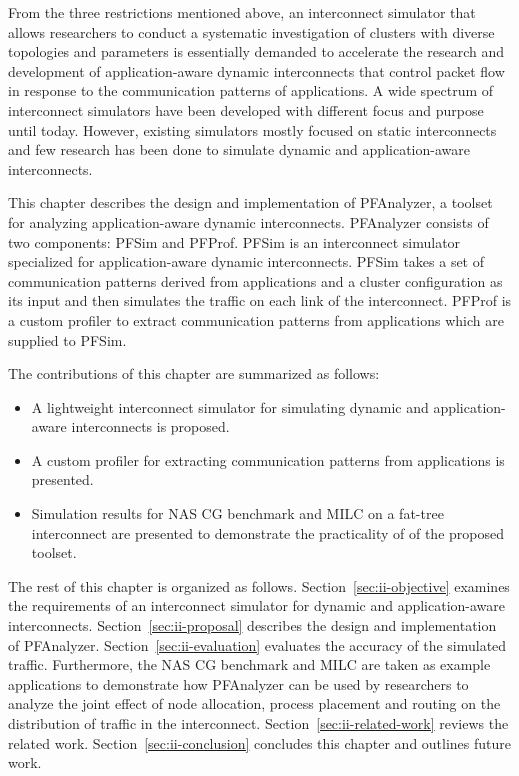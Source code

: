 From the three restrictions mentioned above, an interconnect simulator that
allows researchers to conduct a systematic investigation of clusters with
diverse topologies and parameters is essentially demanded to accelerate the
research and development of application-aware dynamic interconnects that
control packet flow in response to the communication patterns of applications.
A wide spectrum of interconnect simulators have been developed with different
focus and purpose until today. However, existing simulators mostly focused on
static interconnects and few research has been done to simulate dynamic and
application-aware interconnects.

This chapter describes the design and implementation of PFAnalyzer, a
toolset for analyzing application-aware dynamic interconnects.
PFAnalyzer consists of two components: PFSim and PFProf. PFSim is an
interconnect simulator specialized for application-aware dynamic
interconnects. PFSim takes a set of communication patterns derived from
applications and a cluster configuration as its input and then simulates the
traffic on each link of the interconnect. PFProf is a custom profiler to
extract communication patterns from applications which are supplied to PFSim.

The contributions of this chapter are summarized as follows:

\begin{itemize}
\item
  A lightweight interconnect simulator for simulating dynamic and
  application-aware interconnects is proposed.
\item
  A custom profiler for extracting communication patterns from
  applications is presented.
\item
  Simulation results for NAS CG benchmark and MILC on a fat-tree
  interconnect are presented to demonstrate the practicality of of the
  proposed toolset.
\end{itemize}

The rest of this chapter is organized as follows.
Section~\ref{sec:ii-objective} examines the requirements of an
interconnect simulator for dynamic and application-aware interconnects.
Section~\ref{sec:ii-proposal} describes the design and implementation of
PFAnalyzer. Section~\ref{sec:ii-evaluation} evaluates the accuracy of the
simulated traffic. Furthermore, the NAS CG benchmark and MILC are taken as
example applications to demonstrate how PFAnalyzer can be used by researchers
to analyze the joint effect of node allocation, process placement and routing
on the distribution of traffic in the interconnect.
Section~\ref{sec:ii-related-work} reviews the related work.
Section~\ref{sec:ii-conclusion} concludes this chapter and outlines future
work.

